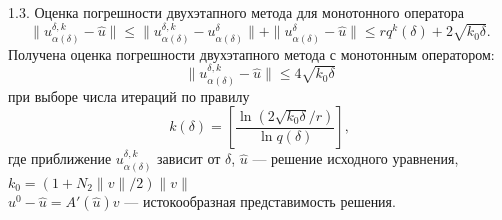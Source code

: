 \documentclass[10pt,pdf, mathserif, hyperref={unicode}]{beamer}
\begin{document}
\begin{frame}{1.3. Оценка погрешности двухэтапного метода для монотонного оператора}
$$\|u_{\alpha(\delta)}^{\delta, k}-\hat{u}\|\le\|u_{\alpha(\delta)}^{\delta, k}-u_{\alpha(\delta)}^{\delta}\|+\|u_{\alpha(\delta)}^{\delta}-\hat{u}\|\le rq^k(\delta)+ 2\sqrt{k_0\delta}.$$
	Получена оценка погрешности двухэтапного метода с монотонным оператором:
	\begin{equation*}
	\|u_{\alpha(\delta)}^{\delta, k}-\hat{u}\|\leqslant 4\sqrt{k_0 \delta}
	\end{equation*}
	при выборе числа итераций по правилу $$k(\delta)=\left[\frac{\ln(2\sqrt{k_0\delta}/r)}{\ln q(\delta)}\right],$$
	где приближение $u_{\alpha(\delta)}^{\delta, k}$ зависит от $\delta$, $\hat{u}$ --- решение исходного уравнения, $k_0=(1+N_2\|v\|/2)\|v\|$ \\
	$u^0-\hat{u}=A'(\hat{u})v$ --- истокообразная представимость решения.
	{ 
	\let\thefootnote\relax\let\thefootnote\relax{}
	\let\thefootnote\relax\let\thefootnote\relax{}
	}
\end{frame}
\end{document}
